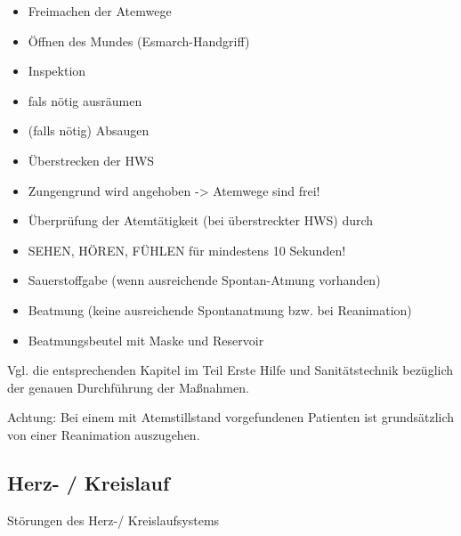 \documentclass{article}
\begin{document}
\begin{itemize}
\item Freimachen der Atemwege

\end{itemize}
\begin{itemize}
\item \"Offnen des Mundes (Esmarch-Handgriff)

\item Inspektion

\item fals n\"otig ausr\"aumen 

\item (falls n\"otig) Absaugen

\item \"Uberstrecken der HWS

\item Zungengrund wird angehoben -{\textgreater} Atemwege  sind frei!

\end{itemize}
\begin{itemize}
\item \"Uberpr\"ufung der Atemt\"atigkeit (bei  \"uberstreckter HWS)
durch

\end{itemize}
\begin{itemize}
\item SEHEN, H\"OREN, F\"UHLEN f\"ur mindestens 10  Sekunden!

\end{itemize}
\begin{itemize}
\item Sauerstoffgabe (wenn ausreichende Spontan-Atmung vorhanden)

\item Beatmung (keine ausreichende Spontanatmung bzw. bei Reanimation)

\end{itemize}
\begin{itemize}
\item Beatmungsbeutel mit Maske und Reservoir

\end{itemize}
Vgl. die entsprechenden Kapitel im Teil Erste Hilfe und
Sanit\"atstechnik bez\"uglich der genauen Durchf\"uhrung der
Ma{\ss}nahmen. 

Achtung: Bei einem mit Atemstillstand vorgefundenen Patienten ist
grunds\"atzlich von einer Reanimation auszugehen. 

\subsection[Herz- / Kreislauf]{Herz- / Kreislauf}
\label{bkm:RefHeading42514202}St\"orungen des Herz-/ Kreislaufsystems
\end{document}
